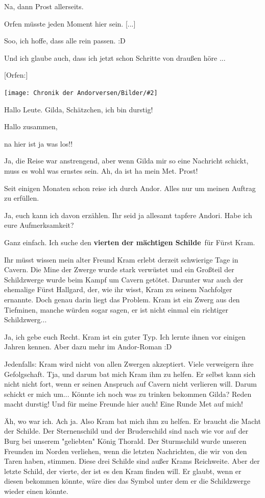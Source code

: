 \documentclass[10pt, a4paper, oneside]{book}
\newcommand{\bildmitts}[2][height=0.32\textwidth,width=0.48\textwidth,keepaspectratio]{%
    \begin{center}
        \texttt{[image: Chronik der Andorversen/Bilder/\#2]}
    \end{center}
}
\begin{document}
\begin{multicols}{2}
Na, dann Prost allerseits.

Orfen müsste jeden Moment hier sein. [...]

Soo, ich hoffe, dass alle rein passen. :D

Und ich glaube auch, dass ich jetzt schon Schritte von draußen höre ...

[Orfen:]

\bildmitts{AA2015 Der Auftrag 1.jpeg}

Hallo Leute. Gilda, Schätzchen, ich bin durstig!


Hallo zusammen,

na hier ist ja was los!!

Ja, die Reise war anstrengend, aber wenn Gilda mir so eine Nachricht schickt, muss es wohl was ernstes sein. Ah, da ist ha mein Met. Prost!

Seit einigen Monaten schon reise ich durch Andor. Alles nur um meinen Auftrag zu erfüllen.

Ja, euch kann ich davon erzählen. Ihr seid ja allesamt tapfere Andori.
Habe ich eure Aufmerksamkeit?

Ganz einfach. Ich suche den \textbf{vierten der mächtigen Schilde} für Fürst Kram.

Ihr müsst wissen mein alter Freund Kram erlebt derzeit schwierige Tage in Cavern. Die Mine der Zwerge wurde stark verwüstet und ein Großteil der Schildzwerge wurde beim Kampf um Cavern getötet. Darunter war auch der ehemalige Fürst Hallgard, der, wie ihr wisst, Kram zu seinem Nachfolger ernannte. Doch genau darin liegt das Problem. Kram ist ein Zwerg aus den Tiefminen, manche würden sogar sagen, er ist nicht einmal ein richtiger Schildzwerg...

Ja, ich gebe euch Recht. Kram ist ein guter Typ. Ich lernte ihnen vor einigen Jahren kennen. Aber dazu mehr im Andor-Roman :D

Jedenfalls: Kram wird nicht von allen Zwergen akzeptiert. Viele verweigern ihre Gefolgschaft. Tja, und darum bat mich Kram ihm zu helfen. Er selbst kann sich nicht nicht fort, wenn er seinen Anspruch auf Cavern nicht verlieren will. Darum schickt er mich um... Könnte ich noch was zu trinken bekommen Gilda? Reden macht durstig! Und für meine Freunde hier auch! Eine Runde Met auf mich!

Äh, wo war ich. Ach ja. Also Kram bat mich ihm zu helfen. Er braucht die Macht der Schilde. Der Sternenschild und der Bruderschild sind nach wie vor auf der Burg bei unserem "geliebten" König Thorald. Der Sturmschild wurde unseren Freunden im Norden verliehen, wenn die letzten Nachrichten, die wir von den Taren haben, stimmen. Diese drei Schilde sind außer Krams Reichweite. Aber der letzte Schild, der vierte, der ist es den Kram finden will. Er glaubt, wenn er diesen bekommen könnte, wäre dies das Symbol unter dem er die Schildzwerge wieder einen könnte.


\end{multicols}
\end{document}
